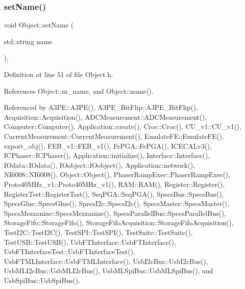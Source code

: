 \subsubsection{\texorpdfstring{set\+Name()}{setName()}}
{\footnotesize\ttfamily void Object\+::set\+Name (\begin{DoxyParamCaption}\item[{std\+::string}]{name }\end{DoxyParamCaption})\hspace{0.3cm}{\ttfamily [inline]}, {\ttfamily [inherited]}}



Definition at line 51 of file Object.\+h.



References Object\+::m\+\_\+name, and Object\+::name().



Referenced by A3\+P\+E\+::\+A3\+P\+E(), A3\+P\+E\+\_\+\+Bit\+Flip\+::\+A3\+P\+E\+\_\+\+Bit\+Flip(), Acquisition\+::\+Acquisition(), A\+D\+C\+Measurement\+::\+A\+D\+C\+Measurement(), Computer\+::\+Computer(), Application\+::create(), Croc\+::\+Croc(), C\+U\+\_\+v1\+::\+C\+U\+\_\+v1(), Current\+Measurement\+::\+Current\+Measurement(), Emulate\+F\+E\+::\+Emulate\+F\+E(), export\+\_\+obj(), F\+E\+B\+\_\+v1\+::\+F\+E\+B\+\_\+v1(), Fe\+P\+G\+A\+::\+Fe\+P\+G\+A(), I\+C\+E\+C\+A\+Lv3(), I\+C\+Phaser\+::\+I\+C\+Phaser(), Application\+::initialize(), Interface\+::\+Interface(), I\+Odata\+::\+I\+Odata(), I\+Oobject\+::\+I\+Oobject(), Application\+::network(), N\+I6008\+::\+N\+I6008(), Object\+::\+Object(), Phaser\+Ramp\+Exec\+::\+Phaser\+Ramp\+Exec(), Proto40\+M\+Hz\+\_\+v1\+::\+Proto40\+M\+Hz\+\_\+v1(), R\+A\+M\+::\+R\+A\+M(), Register\+::\+Register(), Register\+Test\+::\+Register\+Test(), Seq\+P\+G\+A\+::\+Seq\+P\+G\+A(), Specs\+Bus\+::\+Specs\+Bus(), Specs\+Glue\+::\+Specs\+Glue(), Specs\+I2c\+::\+Specs\+I2c(), Specs\+Master\+::\+Specs\+Master(), Specs\+Mezzanine\+::\+Specs\+Mezzanine(), Specs\+Parallel\+Bus\+::\+Specs\+Parallel\+Bus(), Storage\+Fifo\+::\+Storage\+Fifo(), Storage\+Fifo\+Acquisition\+::\+Storage\+Fifo\+Acquisition(), Test\+I2\+C\+::\+Test\+I2\+C(), Test\+S\+P\+I\+::\+Test\+S\+P\+I(), Test\+Suite\+::\+Test\+Suite(), Test\+U\+S\+B\+::\+Test\+U\+S\+B(), Usb\+F\+T\+Interface\+::\+Usb\+F\+T\+Interface(), Usb\+F\+T\+Interface\+Test\+::\+Usb\+F\+T\+Interface\+Test(), Usb\+F\+T\+M\+L\+Interface\+::\+Usb\+F\+T\+M\+L\+Interface(), Usb\+I2c\+Bus\+::\+Usb\+I2c\+Bus(), Usb\+M\+L\+I2c\+Bus\+::\+Usb\+M\+L\+I2c\+Bus(), Usb\+M\+L\+Spi\+Bus\+::\+Usb\+M\+L\+Spi\+Bus(), and Usb\+Spi\+Bus\+::\+Usb\+Spi\+Bus().


